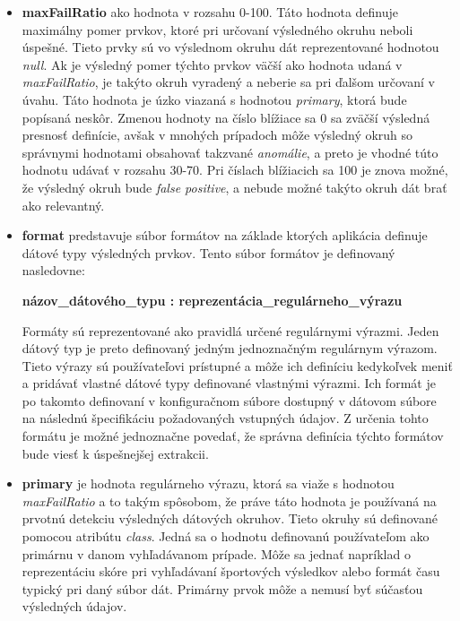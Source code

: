 \begin{itemize}
  \item \textbf{maxFailRatio} ako hodnota v rozsahu 0-100. Táto hodnota definuje maximálny pomer prvkov, ktoré pri určovaní výsledného okruhu neboli úspešné. Tieto prvky sú vo výslednom okruhu dát reprezentované hodnotou \textit{null}. Ak je výsledný pomer týchto prvkov väčší ako hodnota udaná v \textit{maxFailRatio}, je takýto okruh vyradený a neberie sa pri ďalšom určovaní v úvahu. Táto hodnota je úzko viazaná s hodnotou \textit{primary}, ktorá bude popísaná neskôr. Zmenou hodnoty na číslo blížiace sa 0 sa zväčší výsledná presnosť definície, avšak v mnohých prípadoch môže výsledný okruh so správnymi hodnotami obsahovať takzvané \textit{anomálie}, a preto je vhodné túto hodnotu udávať v rozsahu 30-70. Pri číslach blížiacich sa 100 je znova možné, že výsledný okruh bude \textit{false positive}, a nebude možné takýto okruh dát brať ako relevantný.
  \item \textbf{format} predstavuje súbor formátov na základe ktorých aplikácia definuje dátové typy výsledných prvkov. Tento súbor formátov je definovaný nasledovne:
  
  \textbf{názov\_dátového\_typu : reprezentácia\_regulárneho\_výrazu}
  
  Formáty sú reprezentované ako pravidlá určené regulárnymi výrazmi. Jeden  dátový typ je preto definovaný jedným jednoznačným regulárnym výrazom. Tieto výrazy sú používateľovi prístupné a môže ich definíciu kedykoľvek meniť a pridávať vlastné dátové typy definované vlastnými výrazmi. Ich formát je po takomto definovaní v konfiguračnom súbore dostupný v dátovom súbore na následnú špecifikáciu požadovaných vstupných údajov. Z určenia tohto formátu je možné jednoznačne povedať, že správna definícia týchto formátov bude viesť k úspešnejšej extrakcii. 
  
  \item \textbf{primary} je hodnota regulárneho výrazu, ktorá sa viaže s hodnotou \textit{maxFailRatio} a to takým spôsobom, že práve táto hodnota je používaná na prvotnú detekciu výsledných dátových okruhov. Tieto okruhy sú definované pomocou atribútu \textit{class}. Jedná sa o hodnotu definovanú používateľom ako primárnu v danom vyhľadávanom prípade. Môže sa jednať napríklad o reprezentáciu skóre pri vyhľadávaní športových výsledkov alebo formát času typický pri daný súbor dát. Primárny prvok môže a nemusí byť súčasťou výsledných údajov.
\end{itemize}

